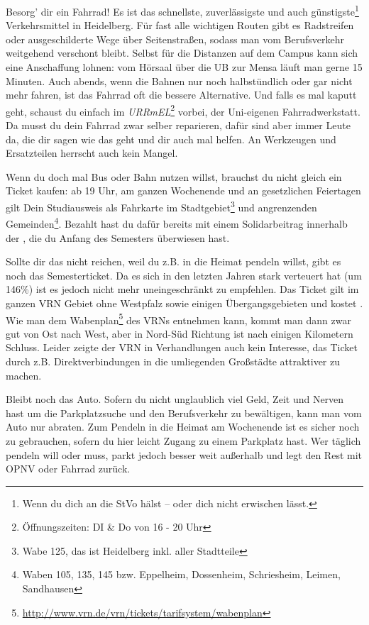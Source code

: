 Besorg' dir ein Fahrrad! Es ist das schnellste, zuverlässigste und auch günstigste\footnote{Wenn du dich an die StVo hälst -- oder dich nicht erwischen lässt.} Verkehrsmittel in Heidelberg. Für fast alle wichtigen Routen gibt es Radstreifen oder ausgeschilderte Wege über Seitenstraßen, sodass man vom Berufsverkehr weitgehend verschont bleibt. Selbst für die Distanzen auf dem Campus kann sich eine Anschaffung lohnen: vom Hörsaal über die \gls{UB} zur Mensa läuft man gerne 15 Minuten. Auch abends, wenn die Bahnen nur noch halbstündlich oder gar nicht mehr fahren, ist das Fahrrad oft die bessere Alternative. Und falls es mal kaputt geht, schaust du einfach im \emph{URRmEL}\footnote{Öffnungszeiten: DI \& Do von 16 - 20 Uhr} vorbei, der Uni-eigenen Fahrradwerkstatt. Da musst du dein Fahrrad zwar selber reparieren, dafür sind aber immer Leute da, die dir sagen wie das geht und dir auch mal helfen. An Werkzeugen und Ersatzteilen herrscht auch kein Mangel.

Wenn du doch mal Bus oder Bahn nutzen willst, brauchst du nicht gleich ein Ticket kaufen: ab 19 Uhr, am ganzen Wochenende und an gesetzlichen Feiertagen gilt Dein Studiausweis als Fahrkarte im Stadtgebiet\footnote{Wabe 125, das ist Heidelberg inkl. aller Stadtteile} und angrenzenden Gemeinden\footnote{Waben 105, 135, 145 bzw. Eppelheim, Dossenheim, Schriesheim, Leimen, Sandhausen}. Bezahlt hast du dafür bereits mit einem Solidarbeitrag innerhalb der \EUR{\beitragssumme}, die du Anfang des Semesters überwiesen hast.

Sollte dir das nicht reichen, weil du z.B. in die Heimat pendeln willst, gibt es noch das Semesterticket. Da es sich in den letzten Jahren stark verteuert hat (um 146\%) ist es jedoch nicht mehr uneingeschränkt zu empfehlen. Das Ticket gilt im ganzen VRN Gebiet ohne Westpfalz sowie einigen Übergangsgebieten und kostet \EUR{\semesterticket}. Wie man dem Wabenplan\footnote{\url{http://www.vrn.de/vrn/tickets/tarifsystem/wabenplan}} des \glspl{VRN} entnehmen kann, kommt man dann zwar gut von Ost nach West, aber in Nord-Süd Richtung ist nach einigen Kilometern Schluss. Leider zeigte der \gls{VRN} in Verhandlungen auch kein Interesse, das Ticket durch z.B. Direktverbindungen in die umliegenden Großstädte attraktiver zu machen.


Bleibt noch das Auto. Sofern du nicht unglaublich viel Geld, Zeit und Nerven hast um die Parkplatzsuche und den Berufsverkehr zu bewältigen, kann man vom Auto nur abraten. Zum Pendeln in die Heimat am Wochenende ist es sicher noch zu gebrauchen, sofern du hier leicht Zugang zu einem Parkplatz hast. Wer täglich pendeln will oder muss, parkt jedoch besser weit außerhalb und legt den Rest mit \gls{OPNV} oder Fahrrad zurück.

